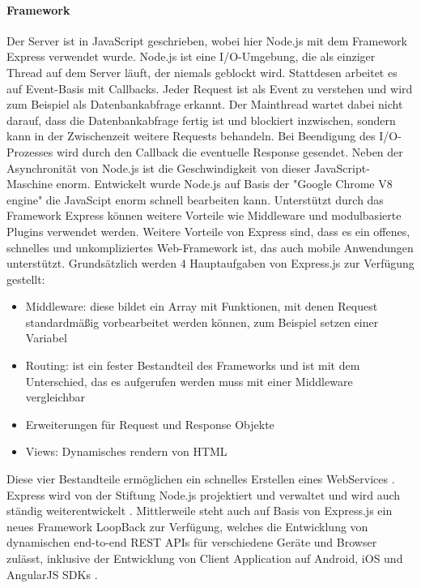 \paragraph{Framework}
Der Server ist in JavaScript geschrieben, wobei hier Node.js mit dem Framework Express verwendet wurde. Node.js ist eine I/O-Umgebung, die als einziger Thread auf dem Server läuft, der niemals geblockt wird. Stattdesen arbeitet es auf Event-Basis mit Callbacks. Jeder Request ist als Event zu verstehen und wird zum Beispiel als Datenbankabfrage erkannt. Der Mainthread wartet dabei nicht darauf, dass die Datenbankabfrage fertig ist und blockiert inzwischen, sondern kann in der Zwischenzeit weitere Requests behandeln. Bei Beendigung des I/O-Prozesses wird durch den Callback die eventuelle Response gesendet. Neben der Asynchronität von Node.js ist die Geschwindigkeit von dieser JavaScript-Maschine enorm. Entwickelt wurde Node.js auf Basis der "Google Chrome V8 engine" die JavaScipt enorm schnell bearbeiten kann. Unterstützt durch das Framework Express können weitere Vorteile wie Middleware und modulbasierte Plugins verwendet werden. Weitere Vorteile von Express sind, dass es ein offenes, schnelles und unkompliziertes Web-Framework ist, das auch mobile Anwendungen unterstützt. Grundsätzlich werden 4 Hauptaufgaben von Express.js zur Verfügung gestellt:
\begin{itemize}
	\item Middleware: diese bildet ein Array mit Funktionen, mit denen Request standardmäßig vorbearbeitet werden können, zum Beispiel setzen einer Variabel
	\item Routing: ist ein fester Bestandteil des Frameworks und ist mit dem Unterschied, das es aufgerufen werden muss mit einer Middleware vergleichbar
	\item Erweiterungen für Request und Response Objekte
	\item Views: Dynamisches rendern von HTML
\end {itemize} 
Diese vier Bestandteile ermöglichen ein schnelles Erstellen eines WebServices \parencite{expressinaction}. 
Express wird von der Stiftung Node.js projektiert und verwaltet und wird auch ständig weiterentwickelt \parencite{expressjs}. Mittlerweile steht auch auf Basis von Express.js ein neues Framework LoopBack zur Verfügung, welches die Entwicklung von dynamischen end-to-end REST APIs für verschiedene Geräte und Browser zulässt, inklusive der Entwicklung von Client Application auf Android, iOS und AngularJS SDKs \parencite{loopback}.

